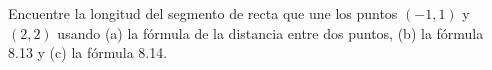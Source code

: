 \item Encuentre la longitud del segmento de recta que une los puntos $(-1, 1)$ y $(2, 2)$ usando (a) la fórmula de la distancia entre dos puntos, (b) la fórmula 8.13 y (c) la fórmula 8.14.
